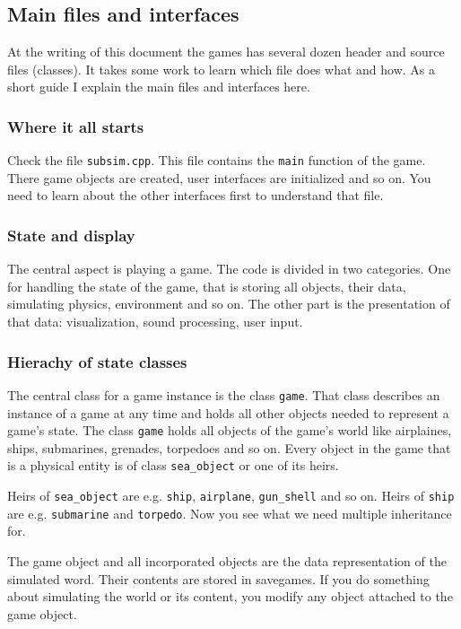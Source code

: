 \documentclass{report}
\begin{document}
\subsection{Main files and interfaces}

At the writing of this document the games has several dozen header and
source files (classes). It takes some work to learn which file does what
and how. As a short guide I explain the main files and interfaces here.

\subsubsection{Where it all starts}

Check the file \texttt{subsim.cpp}. This file contains the \texttt{main}
function of the game. There game objects are created, user interfaces
are initialized and so on. You need to learn about the other interfaces
first to understand that file.

\subsubsection{State and display}

The central aspect is playing a game. The code is divided in two
categories. One for handling the state of the game, that is storing all
objects, their data, simulating physics, environment and so on. The
other part is the presentation of that data: visualization, sound
processing, user input.

\subsubsection{Hierachy of state classes}

The central class for a game instance is the class \texttt{game}. That
class describes an instance of a game at any time and holds all other
objects needed to represent a game's state. The class \texttt{game}
holds all objects of the game's world like airplaines, ships,
submarines, grenades, torpedoes and so on. Every object in the game that
is a physical entity is of class \texttt{sea\_object} or one of its
heirs.

Heirs of \texttt{sea\_object} are e.g. \texttt{ship}, \texttt{airplane},
\texttt{gun\_shell} and so on. Heirs of \texttt{ship} are e.g.
\texttt{submarine} and \texttt{torpedo}. Now you see what we need
multiple inheritance for.

The game object and all incorporated objects are the data representation
of the simulated word. Their contents are stored in savegames. If you do
something about simulating the world or its content, you modify any
object attached to the game object.
\end{document}
